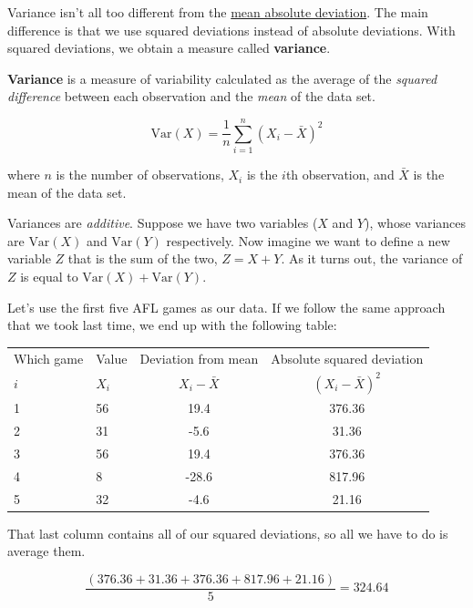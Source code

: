 \documentclass[
  11pt,
  a4paper,
  twoside,symmetric,openright]{book}
\theoremstyle{break}
\theoremstyle{break}
\begin{document}
Variance isn't all too different from the \protect\hyperlink{aad}{mean absolute deviation}. The main difference is that we use squared deviations instead of absolute deviations. With squared deviations, we obtain a measure called \textbf{variance}.

\begin{definition}[Variance]
\protect\hypertarget{def:defVar}{}\label{def:defVar}\textbf{Variance} is a measure of variability calculated as the average of the \emph{squared difference} between each observation and the \emph{mean} of the data set.

\[
\mbox{Var}(X) = \frac{1}{n} \sum_{i=1}^n (X_i - \bar{X})^2
\]

where \(n\) is the number of observations, \(X_i\) is the \(i\)th observation, and \(\bar{X}\) is the mean of the data set.
\end{definition}

Variances are \emph{additive}. Suppose we have two variables (\(X\) and \(Y\)), whose variances are \(\mbox{Var}(X)\) and \(\mbox{Var}(Y)\) respectively. Now imagine we want to define a new variable \(Z\) that is the sum of the two, \(Z = X+Y\). As it turns out, the variance of \(Z\) is equal to \(\mbox{Var}(X) + \mbox{Var}(Y)\).

\begin{example}
\protect\hypertarget{exm:exVarAddit}{}\label{exm:exVarAddit}Let's use the first five AFL games as our data. If we follow the same approach that we took last time, we end up with the following table:

\begin{table}[H]
\centering
\begin{tabular}{llcc}
\toprule
\multicolumn{1}{c}{Which game} & \multicolumn{1}{c}{Value} & \multicolumn{1}{c}{Deviation from mean} & \multicolumn{1}{c}{Absolute squared deviation} \\
\cmidrule(l{3pt}r{3pt}){1-1} \cmidrule(l{3pt}r{3pt}){2-2} \cmidrule(l{3pt}r{3pt}){3-3} \cmidrule(l{3pt}r{3pt}){4-4}
$i$ & $X_i$ & $X_i - \bar{X}$ & $(X_i - \bar{X})^2$\\
\midrule
1 & 56 & 19.4 & 376.36\\
2 & 31 & -5.6 & 31.36\\
3 & 56 & 19.4 & 376.36\\
4 & 8 & -28.6 & 817.96\\
5 & 32 & -4.6 & 21.16\\
\bottomrule
\end{tabular}
\end{table}

That last column contains all of our squared deviations, so all we have to do is average them.

\[
\frac{( 376.36 + 31.36 + 376.36 + 817.96 + 21.16 )}{5} = 324.64
\]
\end{example}
\end{document}
